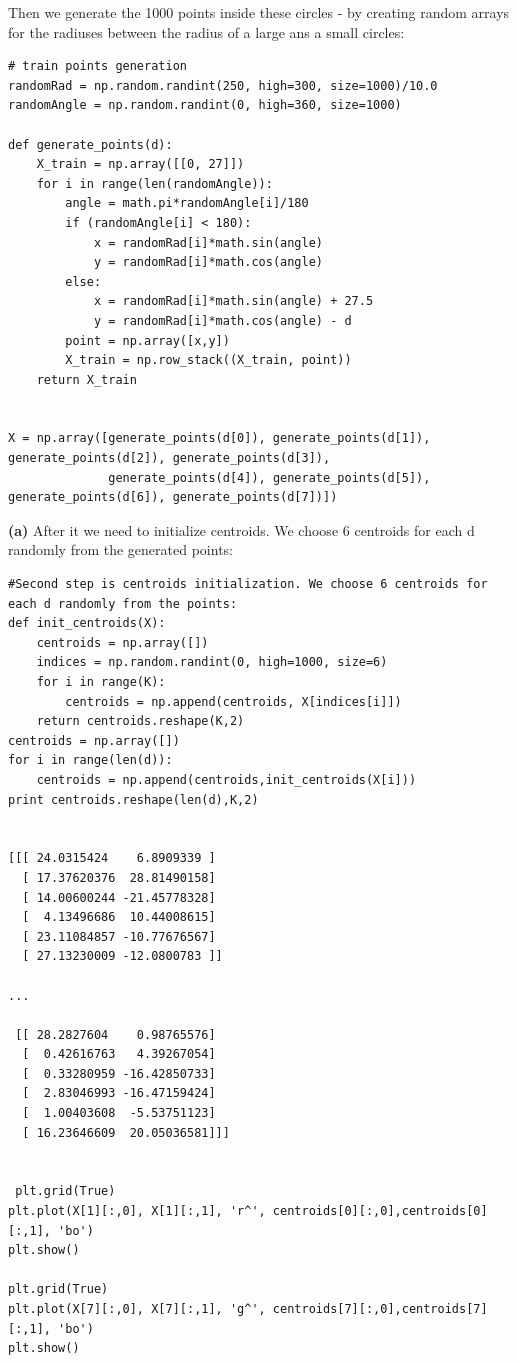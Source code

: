 \documentclass[a4paper, 12pt]{article}
\begin{document}
Then we generate the 1000 points inside these circles - by creating random arrays for the radiuses between the radius of a large ans a small circles:
\begin{lstlisting}
# train points generation
randomRad = np.random.randint(250, high=300, size=1000)/10.0
randomAngle = np.random.randint(0, high=360, size=1000)

def generate_points(d):
    X_train = np.array([[0, 27]])
    for i in range(len(randomAngle)):
        angle = math.pi*randomAngle[i]/180
        if (randomAngle[i] < 180):
            x = randomRad[i]*math.sin(angle)
            y = randomRad[i]*math.cos(angle)
        else:
            x = randomRad[i]*math.sin(angle) + 27.5
            y = randomRad[i]*math.cos(angle) - d
        point = np.array([x,y])
        X_train = np.row_stack((X_train, point))
    return X_train


X = np.array([generate_points(d[0]), generate_points(d[1]), generate_points(d[2]), generate_points(d[3]),
              generate_points(d[4]), generate_points(d[5]), generate_points(d[6]), generate_points(d[7])]) 
\end{lstlisting}

\textbf{(a)} After it we need to initialize centroids. We choose 6 centroids for each d randomly from the generated points:

\begin{lstlisting}
#Second step is centroids initialization. We choose 6 centroids for each d randomly from the points:
def init_centroids(X):
    centroids = np.array([])
    indices = np.random.randint(0, high=1000, size=6)
    for i in range(K):
        centroids = np.append(centroids, X[indices[i]])
    return centroids.reshape(K,2)
centroids = np.array([])
for i in range(len(d)):
    centroids = np.append(centroids,init_centroids(X[i]))
print centroids.reshape(len(d),K,2)


[[[ 24.0315424    6.8909339 ]
  [ 17.37620376  28.81490158]
  [ 14.00600244 -21.45778328]
  [  4.13496686  10.44008615]
  [ 23.11084857 -10.77676567]
  [ 27.13230009 -12.0800783 ]]

...

 [[ 28.2827604    0.98765576]
  [  0.42616763   4.39267054]
  [  0.33280959 -16.42850733]
  [  2.83046993 -16.47159424]
  [  1.00403608  -5.53751123]
  [ 16.23646609  20.05036581]]]
  
  
 plt.grid(True)
plt.plot(X[1][:,0], X[1][:,1], 'r^', centroids[0][:,0],centroids[0][:,1], 'bo')
plt.show()

plt.grid(True)
plt.plot(X[7][:,0], X[7][:,1], 'g^', centroids[7][:,0],centroids[7][:,1], 'bo')
plt.show()
\end{lstlisting}
\end{document}
